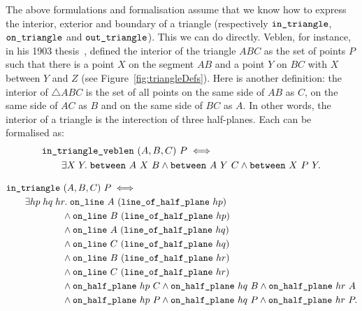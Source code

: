 The above formulations and formalisation assume that we know how to express the interior, exterior and boundary of a triangle (respectively $\texttt{in\_triangle}$, $\texttt{on\_triangle}$ and $\texttt{out\_triangle}$). This we can do directly. Veblen, for instance, in his 1903 thesis~\cite{Veblenphd}, defined the interior of the triangle $ABC$ as the set of points $P$ such that there is a point $X$ on the segment $AB$ and a point $Y$ on $BC$ with $X$ between $Y$ and $Z$ (see Figure~\ref{fig:triangleDefs}). Here is another definition: the interior of $\triangle ABC$ is the set of all points on the same side of $AB$ as $C$, on the same side of $AC$ as $B$ and on the same side of $BC$ as $A$. In other words, the interior of a triangle is the interection of three half-planes. Each can be formalised as:
\begin{equation*}
\begin{split}
  &\texttt{in\_triangle\_veblen}\ (A,B,C)\ P \iff\\
  &\qquad\exists X\; Y.\; \texttt{between}\ A\ X\ B \wedge \texttt{between}\ A\ Y\ C \wedge \texttt{between}\ X\ P\ Y.
\end{split}
\end{equation*}

\begin{equation}\label{eq:inTriangleDef}
\begin{split}
  &\code{in\_triangle}\ (A,B,C)\ P \iff\\
    &\qquad\exists hp\; hq\; hr.\;\code{on\_line}\ A\ (\code{line\_of\_half\_plane}\ hp)\\
    &\qquad\qquad\qquad\wedge \code{on\_line}\ B\ (\code{line\_of\_half\_plane}\  hp)\\
    &\qquad\qquad\qquad\wedge \code{on\_line}\ A\ (\code{line\_of\_half\_plane}\  hq)\\
    &\qquad\qquad\qquad\wedge \code{on\_line}\ C\ (\code{line\_of\_half\_plane}\  hq)\\
    &\qquad\qquad\qquad\wedge \code{on\_line}\ B\ (\code{line\_of\_half\_plane}\  hr)\\
    &\qquad\qquad\qquad\wedge \code{on\_line}\ C\ (\code{line\_of\_half\_plane}\  hr)\\
    &\qquad\qquad\qquad\wedge \code{on\_half\_plane}\ hp\ C \wedge \code{on\_half\_plane}\ hq\ B \wedge \code{on\_half\_plane}\ hr\ A\\
    &\qquad\qquad\qquad\wedge \code{on\_half\_plane}\ hp\ P \wedge \code{on\_half\_plane}\ hq\ P \wedge \code{on\_half\_plane}\ hr\ P.
\end{split}
\end{equation}

